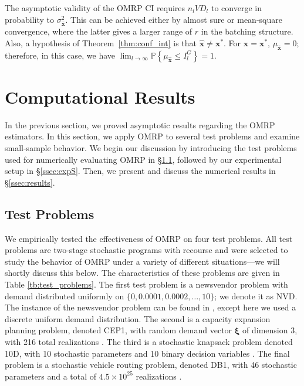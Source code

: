 \documentclass[12pt]{article}
\newcommand{\p}[1]{\mathbb{P} \left\{ #1 \right\}}
\newcommand{\x}{\mathbf{x}}
\newcommand{\xh}{{\hat{\x}}}
\newcommand{\xs}{\x^*}
\newcommand{\xit}{\boldsymbol{\xi}}
\begin{document}
The asymptotic validity of the OMRP CI requires $n_l VD_l$ to converge in probability to $\sigma^{2}_{\xh}$. 
This can be achieved either by almost sure or mean-square convergence, where the latter gives a larger range of $r$ in the batching structure.
Also, a hypothesis of Theorem~\ref{thm:conf_int} is that $\xh \neq \xs$.  
For $\xh = \xs$, $\mu_\xh = 0$; therefore, in this case, we have $\lim_{l\rightarrow\infty} \p{\mu_\xh \leq I^G_l} = 1$. 

\section{Computational Results}
\label{sec:comp}

In the previous section, we proved asymptotic results regarding the OMRP estimators. 
In this section, we apply OMRP to several test problems and examine small-sample behavior. 
We begin our discussion by introducing the test problems used for numerically evaluating OMRP in \S \ref{ssec:test}, followed by our experimental setup in \S \ref{ssec:expS}. Then, we present and discuss the numerical results in \S \ref{ssec:results}. 

\subsection{Test Problems}
\label{ssec:test}


We empirically tested the effectiveness of OMRP on four test problems.
All test problems are two-stage stochastic programs with recourse and were selected to study the behavior of OMRP under a variety of different situations---we will shortly discuss this below.
The characteristics of these problems are given in Table \ref{tb:test_problems}. 
The first test problem is a newsvendor problem with demand distributed uniformly on $\{0, 0.0001, 0.0002, \dots, 10\}$; we denote it as NVD.
The instance of the newsvendor problem can be found in \citep{Bayraksan2006}, except here we used a discrete uniform demand distribution.
The second is a capacity expansion planning problem, denoted CEP1, with random demand vector $\xit$ of dimension 3, with 216 total realizations \citep{higle1996}.
The third is a stochastic knapsack problem denoted 10D, with 10 stochastic parameters and 10 binary decision variables \citep{kleywegt2002sample}.
The final problem is a stochastic vehicle routing problem, denoted DB1, with 46 stochastic parameters and a total of $4.5 \times 10^{25}$ realizations \citep{donohue1995upper}.
\end{document}
